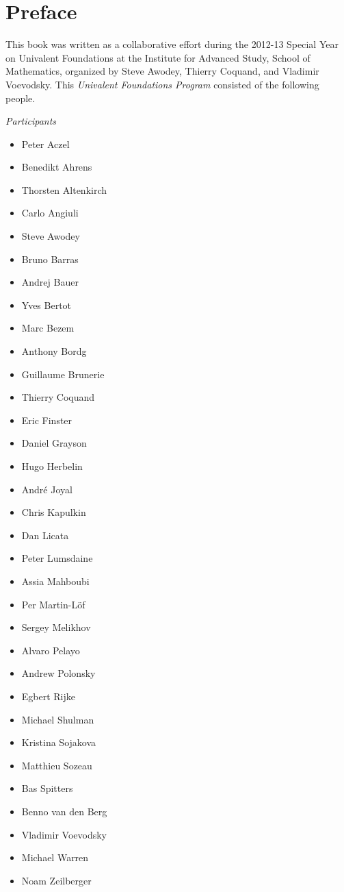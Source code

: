 \chapter*{Preface}
\label{cha:preface}


This book was written as a collaborative effort during the 2012-13 Special Year on Univalent Foundations at the Institute for Advanced Study, School of Mathematics, organized by Steve Awodey, Thierry Coquand, and Vladimir Voevodsky.  This \emph{Univalent Foundations Program} consisted of the following people.

\bigskip
\centerline{\emph{Participants}}
%
\begin{multicols}{3}{
\begin{itemize}
\item[] Peter Aczel
\item[] Benedikt Ahrens
\item[] Thorsten Altenkirch
\item[] Carlo Angiuli
\item[] Steve Awodey
\item[] Bruno Barras
\item[] Andrej Bauer
\item[] Yves Bertot
\item[] Marc Bezem
\item[] Anthony Bordg
\item[] Guillaume Brunerie
\item[] Thierry Coquand
\item[] Eric Finster
\item[] Daniel Grayson
\item[] Hugo Herbelin
\item[] Andr\'e Joyal
\item[] Chris Kapulkin
\item[] Dan Licata
\item[] Peter Lumsdaine
\item[] Assia Mahboubi
\item[] Per Martin-L\"of
\item[] Sergey Melikhov
\item[] Alvaro Pelayo
\item[] Andrew Polonsky
\item[] Egbert Rijke
\item[] Michael Shulman
\item[] Kristina Sojakova
\item[] Matthieu Sozeau
\item[] Bas Spitters
\item[] Benno van den Berg
\item[] Vladimir Voevodsky
\item[] Michael Warren
\item[] Noam Zeilberger
\end{itemize}
}
\end{multicols}

